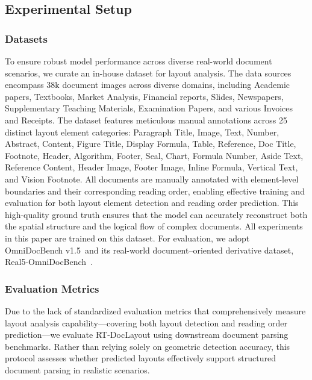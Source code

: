 \documentclass[11pt, a4paper,logo,  copyright, nonumbering]{paddleocr}
\begin{document}
\subsection{Experimental Setup}
\label{subsec:experimental_setup}


\subsubsection{Datasets}
\label{subsubsec:dataset}

To ensure robust model performance across diverse real-world document scenarios, we curate an in-house dataset for layout analysis. The data sources encompass 38k document images across diverse domains, including Academic papers, Textbooks, Market Analysis, Financial reports, Slides, Newspapers, Supplementary Teaching Materials, Examination Papers, and various Invoices and Receipts. The dataset features meticulous manual annotations across 25 distinct layout element categories: Paragraph Title, Image, Text, Number, Abstract, Content, Figure Title, Display Formula, Table, Reference, Doc Title, Footnote, Header, Algorithm, Footer, Seal, Chart, Formula Number, Aside Text, Reference Content, Header Image, Footer Image, Inline Formula, Vertical Text, and Vision Footnote. All documents are manually annotated with element-level boundaries and their corresponding reading order, enabling effective training and evaluation for both layout element detection and reading order prediction. This high-quality ground truth ensures that the model can accurately reconstruct both the spatial structure and the logical flow of complex documents. All experiments in this paper are trained on this dataset. For evaluation, we adopt OmniDocBench v1.5~\cite{ouyang2025omnidocbenchbenchmarkingdiversepdf}and its real-world document–oriented derivative dataset, Real5-OmniDocBench~\cite{zhou2026real5omnidocbenchfullscalephysicalreconstruction}.

\subsubsection{Evaluation Metrics}
\label{subsubsec:evaluation_metrics}

Due to the lack of standardized evaluation metrics that comprehensively measure layout analysis capability—covering both layout detection and reading order prediction—we evaluate RT-DocLayout using downstream document parsing benchmarks. Rather than relying solely on geometric detection accuracy, this protocol assesses whether predicted layouts effectively support structured document parsing in realistic scenarios.
\end{document}
